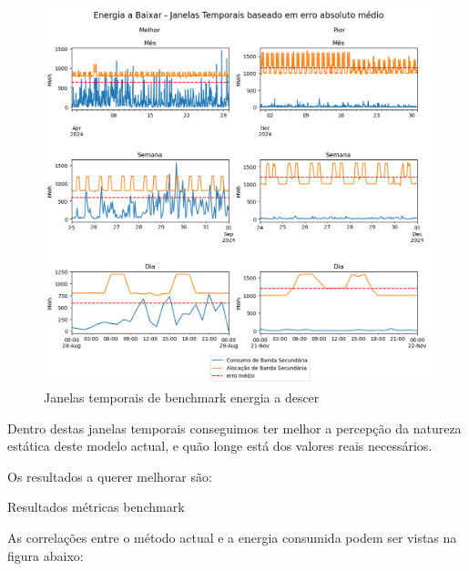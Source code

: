 \begin{figure}[H]
    \centering
    \includegraphics[width=\textwidth]{plots/alocacoes_temporais_downward_dataset.png}
    \caption{Janelas temporais de benchmark energia a descer}
    \label{fig:benchmarktimewindowsdown}
\end{figure}

Dentro destas janelas temporais conseguimos ter melhor a percepção da natureza estática deste modelo actual, e quão longe está dos valores reais necessários.\par

Os resultados a querer melhorar são:\\
\begin{table}[H]
    \caption{Resultados métricas benchmark}    
    \resizebox{\linewidth}{!}{}
    \label{tab:benchmarkmetrics}
    \end{table}

As correlações entre o método actual e a energia consumida podem ser vistas na figura abaixo:\\


